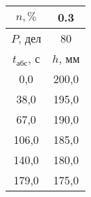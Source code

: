 \begin{tabular}[t]{|c|c|}
\hline
$n, \%$ & 0.3 \\
\hline
$P$, дел & 80 \\
\hline
$t_{абс}$, с & $h$, мм \\ 
\hline
0,0 & 200,0 \\ 
38,0 & 195,0 \\ 
67,0 & 190,0 \\ 
106,0 & 185,0 \\ 
140,0 & 180,0 \\ 
179,0 & 175,0 \\ 
\hline
\end{tabular}